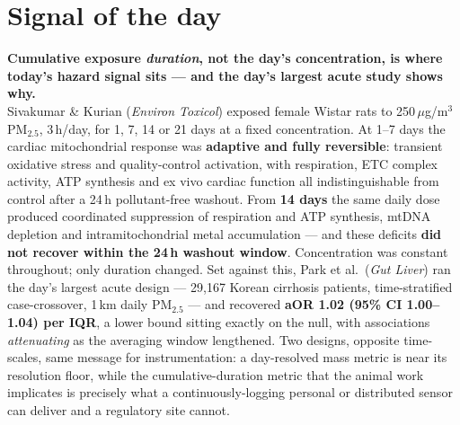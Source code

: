 \documentclass[10pt]{article}
\begin{document}
\vspace{6mm}

\section*{\sffamily\bfseries\color{Deep}Signal of the day}
\vspace{-1.5mm}{\color{Amber}\rule{\linewidth}{1.1pt}}\vspace{2.5mm}

\begin{keybox}
{\sffamily\bfseries\small\color{Deep}Cumulative exposure \emph{duration}, not the day's
concentration, is where today's hazard signal sits --- and the day's largest acute study
shows why.}\\[1.4mm]
\footnotesize
Sivakumar \& Kurian (\textit{Environ Toxicol}) exposed female Wistar rats to
250\,$\mu$g/m$^3$ PM$_{2.5}$, 3\,h/day, for 1, 7, 14 or 21 days at a fixed concentration.
At 1--7 days the cardiac mitochondrial response was \textbf{adaptive and fully reversible}:
transient oxidative stress and quality-control activation, with respiration, ETC complex
activity, ATP synthesis and ex vivo cardiac function all indistinguishable from control
after a 24\,h pollutant-free washout. From \textbf{14 days} the same daily dose produced
coordinated suppression of respiration and ATP synthesis, mtDNA depletion and
intramitochondrial metal accumulation --- and these deficits \textbf{did not recover within
the 24\,h washout window}. Concentration was constant throughout; only duration changed.
Set against this, Park et al.\ (\textit{Gut Liver}) ran the day's largest acute design
--- 29{,}167 Korean cirrhosis patients, time-stratified case-crossover, 1\,km daily
PM$_{2.5}$ --- and recovered \textbf{aOR 1.02 (95\% CI 1.00--1.04) per IQR}, a lower bound
sitting exactly on the null, with associations \emph{attenuating} as the averaging window
lengthened. Two designs, opposite time-scales, same message for instrumentation: a
day-resolved mass metric is near its resolution floor, while the cumulative-duration metric
that the animal work implicates is precisely what a continuously-logging personal or
distributed sensor can deliver and a regulatory site cannot.
\end{keybox}

\vspace{3mm}

\end{document}

